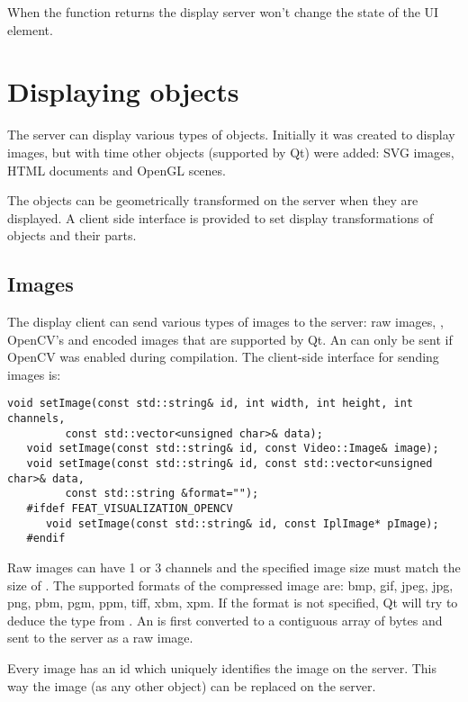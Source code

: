 When the function returns  the display server won't change the state
of the UI element.

\section{Displaying objects}

The server can display various types of objects. Initially it was created to
display images, but with time other objects (supported by Qt) were added:
SVG images, HTML documents and OpenGL scenes.

The objects can be geometrically transformed on the server when they are
displayed. A client side interface is provided to set display transformations
of objects and their parts.

\subsection{Images}

The display client can send various types of images to the server: raw images, 
, OpenCV's  and encoded images that are
supported by Qt. An  can only be sent if OpenCV was enabled
during compilation.
The client-side interface for sending images is:

\begin{Verbatim}[fontsize=\scriptsize,gobble=3]
   void setImage(const std::string& id, int width, int height, int channels,
         const std::vector<unsigned char>& data);
   void setImage(const std::string& id, const Video::Image& image); 
   void setImage(const std::string& id, const std::vector<unsigned char>& data,
         const std::string &format=""); 
   #ifdef FEAT_VISUALIZATION_OPENCV
      void setImage(const std::string& id, const IplImage* pImage); 
   #endif
\end{Verbatim}

Raw images can have 1 or 3 channels and the specified image size must match the
size of . The supported formats of the compressed image are: bmp,
gif, jpeg, jpg, png, pbm, pgm, ppm, tiff, xbm, xpm. If the format is not
specified, Qt will try to deduce the type from . An 
is first converted to a contiguous array of bytes and sent to the server as a
raw image.
 
Every image has an id which uniquely identifies the image on the server. This
way the image (as any other object) can be replaced on the server.

